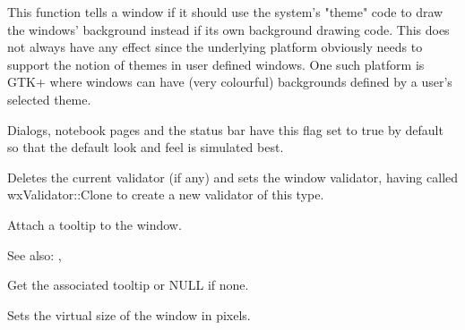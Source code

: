 
This function tells a window if it should use the system's "theme" code
to draw the windows' background instead if its own background drawing
code. This does not always have any effect since the underlying platform
obviously needs to support the notion of themes in user defined windows.
One such platform is GTK+ where windows can have (very colourful) backgrounds
defined by a user's selected theme.

Dialogs, notebook pages and the status bar have this flag set to true
by default so that the default look and feel is simulated best.

\label{wxwindowsetvalidator}


Deletes the current validator (if any) and sets the window validator, having called wxValidator::Clone to
create a new validator of this type.

\label{wxwindowsettooltip}



Attach a tooltip to the window.

See also: ,


\label{wxwindowgettooltip}


Get the associated tooltip or NULL if none.


\label{wxwindowsetvirtualsize}



Sets the virtual size of the window in pixels.


\label{wxwindowsetvirtualsizehints}


